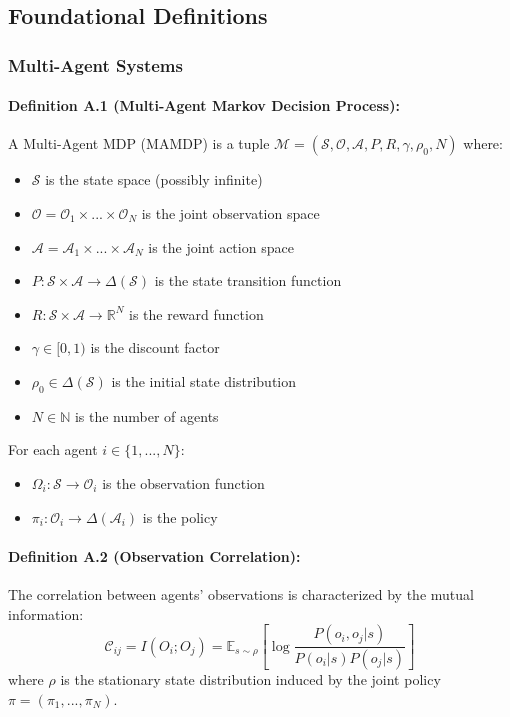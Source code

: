 \documentclass[10pt, letterpaper]{article}
\begin{document}
\subsection{Foundational Definitions}

\subsubsection{Multi-Agent Systems}

\paragraph{Definition A.1 (Multi-Agent Markov Decision Process):} A Multi-Agent MDP (MAMDP) is a tuple $\mathcal{M} = (\mathcal{S}, \mathcal{O}, \mathcal{A}, P, R, \gamma, \rho_0, N)$ where:
\begin{itemize}
    \item $\mathcal{S}$ is the state space (possibly infinite)
    \item $\mathcal{O} = \mathcal{O}_1 \times ... \times \mathcal{O}_N$ is the joint observation space
    \item $\mathcal{A} = \mathcal{A}_1 \times ... \times \mathcal{A}_N$ is the joint action space
    \item $P: \mathcal{S} \times \mathcal{A} \to \Delta(\mathcal{S})$ is the state transition function
    \item $R: \mathcal{S} \times \mathcal{A} \to \mathbb{R}^N$ is the reward function
    \item $\gamma \in [0,1)$ is the discount factor
    \item $\rho_0 \in \Delta(\mathcal{S})$ is the initial state distribution
    \item $N \in \mathbb{N}$ is the number of agents
\end{itemize}
For each agent $i \in \{1, ..., N\}$:
\begin{itemize}
    \item $\Omega_i: \mathcal{S} \to \mathcal{O}_i$ is the observation function
    \item $\pi_i: \mathcal{O}_i \to \Delta(\mathcal{A}_i)$ is the policy
\end{itemize}

\paragraph{Definition A.2 (Observation Correlation):} The correlation between agents' observations is characterized by the mutual information:
\[\mathcal{C}_{ij} = I(O_i; O_j) = \mathbb{E}_{s \sim \rho} \left[ \log \frac{P(o_i, o_j | s)}{P(o_i | s) P(o_j | s)} \right]\]
where $\rho$ is the stationary state distribution induced by the joint policy $\pi = (\pi_1, ..., \pi_N)$.
\end{document}
